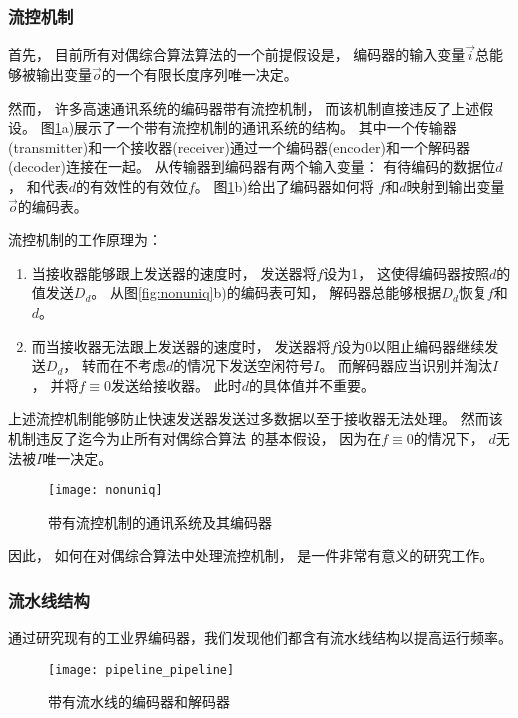 \subsubsection{流控机制}
首先，
目前所有对偶综合算法算法的一个前提假设是，
编码器的输入变量$\vec{i}$总能够被输出变量$\vec{o}$的一个有限长度序列唯一决定。

然而，
许多高速通讯系统的编码器带有流控机制，
而该机制直接违反了上述假设。
图\ref{fig_nonuniq_chap1}a)展示了一个带有流控机制的通讯系统的结构。
其中一个传输器(transmitter)和一个接收器(receiver)通过一个编码器(encoder)和一个解码器(decoder)连接在一起。
从传输器到编码器有两个输入变量：
有待编码的数据位$d$，
和代表$d$的有效性的有效位$f$。
图\ref{fig_nonuniq_chap1}b)给出了编码器如何将
$f$和$d$映射到输出变量$\vec{o}$的编码表。

流控机制的工作原理为：
\begin{enumerate}
\item
当接收器能够跟上发送器的速度时，
发送器将$f$设为1，
这使得编码器按照$d$的值发送$D_d$。
从图\ref{fig:nonuniq}b)的编码表可知，
解码器总能够根据$D_d$恢复$f$和$d$。
\item
而当接收器无法跟上发送器的速度时，
发送器将$f$设为0以阻止编码器继续发送$D_d$，
转而在不考虑$d$的情况下发送空闲符号$I$。
而解码器应当识别并淘汰$I$，
并将$f\equiv 0$发送给接收器。
此时$d$的具体值并不重要。
\end{enumerate}

上述流控机制能够防止快速发送器发送过多数据以至于接收器无法处理。
然而该机制违反了迄今为止所有对偶综合算法
的基本假设，
因为在$f\equiv 0$的情况下，
$d$无法被$I$唯一决定。


\begin{figure}
\centerline{\texttt{[image: nonuniq]}}
\caption{带有流控机制的通讯系统及其编码器}
\label{fig_nonuniq_chap1}
\end{figure}

因此，
如何在对偶综合算法中处理流控机制，
是一件非常有意义的研究工作。

\subsubsection{流水线结构}

通过研究现有的工业界编码器，我们发现他们都含有流水线结构以提高运行频率。
\begin{figure}[b]
\begin{center}
\texttt{[image: pipeline\_pipeline]}
\end{center}
\caption{带有流水线的编码器和解码器}
  \label{fig_pipe_chap1}
\end{figure}


